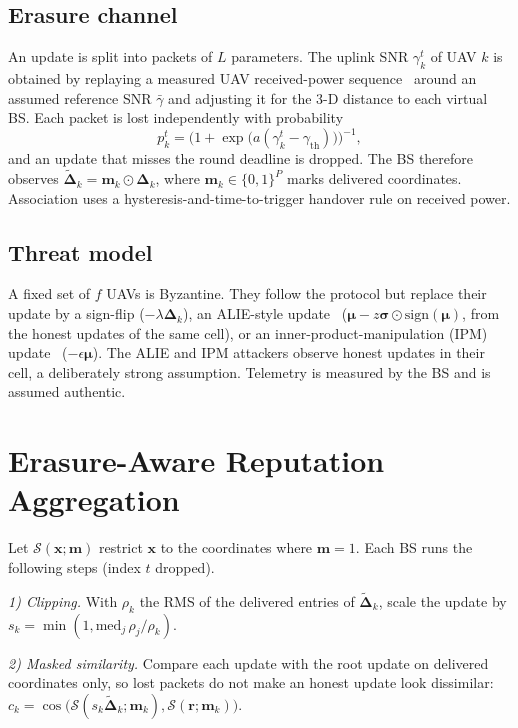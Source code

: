 \documentclass[journal]{IEEEtran}
\begin{document}
\subsection{Erasure channel}
An update is split into packets of $L$ parameters. The uplink SNR $\gamma_k^t$ of UAV
$k$ is obtained by replaying a measured UAV received-power sequence~\cite{alkhateeb2023deepsense}
around an assumed reference SNR $\bar\gamma$ and adjusting it for the 3-D distance to
each virtual BS. Each packet is lost independently with probability
\begin{equation}
  p_k^t = \bigl(1+\exp\bigl(a(\gamma_k^t-\gamma_{\mathrm{th}})\bigr)\bigr)^{-1},
\end{equation}
and an update that misses the round deadline is dropped. The BS therefore observes
$\tilde{\boldsymbol\Delta}_k=\mathbf{m}_k\odot\boldsymbol\Delta_k$, where
$\mathbf{m}_k\in\{0,1\}^P$ marks delivered coordinates. Association uses a
hysteresis-and-time-to-trigger handover rule on received power.

\subsection{Threat model}
A fixed set of $f$ UAVs is Byzantine. They follow the protocol but replace their
update by a sign-flip ($-\lambda\boldsymbol\Delta_k$), an ALIE-style
update~\cite{baruch2019alie} ($\boldsymbol\mu - z\boldsymbol\sigma\odot\mathrm{sign}(\boldsymbol\mu)$,
from the honest updates of the same cell), or an inner-product-manipulation (IPM)
update~\cite{xie2019ipm} ($-\epsilon\boldsymbol\mu$). The ALIE and IPM attackers observe
honest updates in their cell, a deliberately strong assumption. Telemetry is measured
by the BS and is assumed authentic.

\section{Erasure-Aware Reputation Aggregation}
Let $\mathcal{S}(\mathbf{x};\mathbf{m})$ restrict $\mathbf{x}$ to the coordinates where
$\mathbf{m}=1$. Each BS runs the following steps (index $t$ dropped).

\emph{1) Clipping.} With $\rho_k$ the RMS of the delivered entries of
$\tilde{\boldsymbol\Delta}_k$, scale the update by $s_k=\min(1,\mathrm{med}_j\,\rho_j/\rho_k)$.

\emph{2) Masked similarity.} Compare each update with the root update on delivered
coordinates only, so lost packets do not make an honest update look dissimilar:
$c_k=\cos\bigl(\mathcal{S}(s_k\tilde{\boldsymbol\Delta}_k;\mathbf{m}_k),\mathcal{S}(\mathbf{r};\mathbf{m}_k)\bigr)$.
\end{document}
